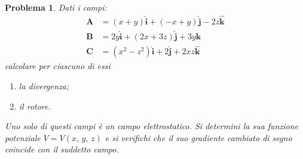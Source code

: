 \documentclass[b5paper,twoside]{book}
\newtheorem{problema}{Problema}
\renewcommand{\vec}[1]{\mathbf{#1}}
\renewcommand{\hat}[1]{\widehat{\mathbf{#1}}}
\begin{document}
\begin{problema}
	Dati i campi:
	\begin{align*}
	\vec{A} &= (x+y)\hat{i} + (-x+y)\hat{j} - 2z\hat{k}\\
	\vec{B} &= 2y\hat{i} + (2x+3z)\hat{j} + 3y\hat{k}\\
	\vec{C} &= (x^2-z^2)\hat{i} + 2\hat{j} + 2xz\hat{k}
	\end{align*}
	calcolare per ciascuno di essi
	\begin{enumerate}
		\item la divergenza;
		\item il rotore.
	\end{enumerate}
	Uno solo di questi campi è un campo elettrostatico. Si determini la sua funzione
	potenziale $V = V(x,\,y,\,z)$ e si verifichi che il suo gradiente cambiato di segno
	coincide con il suddetto campo.
\end{problema}
\end{document}
